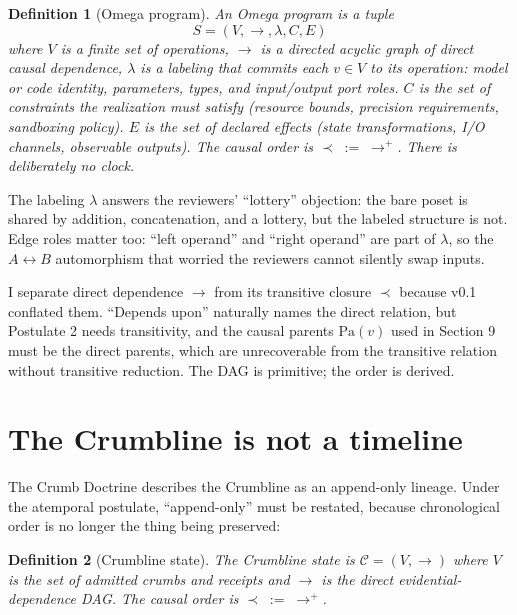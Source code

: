 \documentclass[11pt]{article}
\newtheorem{definition}{Definition}
\begin{document}
\begin{definition}[Omega program]
An Omega program is a tuple
\[
S = (V, \to, \lambda, C, E)
\]
where $V$ is a finite set of operations, $\to$ is a directed acyclic graph of direct causal dependence, $\lambda$ is a labeling that commits each $v \in V$ to its operation: model or code identity, parameters, types, and input/output port roles. $C$ is the set of constraints the realization must satisfy (resource bounds, precision requirements, sandboxing policy). $E$ is the set of declared effects (state transformations, I/O channels, observable outputs). The causal order is $\prec\; :=\; \to^+$. There is deliberately no clock.
\end{definition}

The labeling $\lambda$ answers the reviewers' ``lottery'' objection: the bare poset is shared by addition, concatenation, and a lottery, but the labeled structure is not. Edge roles matter too: ``left operand'' and ``right operand'' are part of $\lambda$, so the $A \leftrightarrow B$ automorphism that worried the reviewers cannot silently swap inputs.

I separate direct dependence $\to$ from its transitive closure $\prec$ because v0.1 conflated them. ``Depends upon'' naturally names the direct relation, but Postulate 2 needs transitivity, and the causal parents $\mathrm{Pa}(v)$ used in Section 9 must be the direct parents, which are unrecoverable from the transitive relation without transitive reduction. The DAG is primitive; the order is derived.

\section{The Crumbline is not a timeline}

The Crumb Doctrine describes the Crumbline as an append-only lineage. Under the atemporal postulate, ``append-only'' must be restated, because chronological order is no longer the thing being preserved:

\begin{center}
\end{center}

\begin{definition}[Crumbline state]
The Crumbline state is $\mathcal{C} = (V, \to)$ where $V$ is the set of admitted crumbs and receipts and $\to$ is the direct evidential-dependence DAG. The causal order is $\prec\; :=\; \to^+$.
\end{definition}
\end{document}
